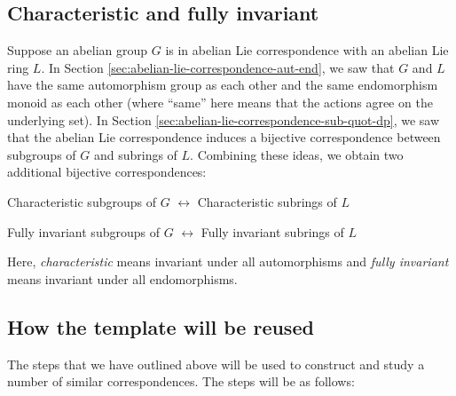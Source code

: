 \documentclass{ucetd}
\begin{document}
\subsection{Characteristic and fully invariant}

Suppose an abelian group $G$ is in abelian Lie correspondence with an
abelian Lie ring $L$. In Section
\ref{sec:abelian-lie-correspondence-aut-end}, we saw that $G$ and $L$
have the same automorphism group as each other and the same
endomorphism monoid as each other (where ``same'' here means that the
actions agree on the underlying set). In Section
\ref{sec:abelian-lie-correspondence-sub-quot-dp}, we saw that the
abelian Lie correspondence induces a bijective correspondence between
subgroups of $G$ and subrings of $L$. Combining these ideas, we obtain
two additional bijective correspondences:

\begin{center}
  Characteristic subgroups of $G$ $\leftrightarrow$ Characteristic
  subrings of $L$
\end{center}

\begin{center}
  Fully invariant subgroups of $G$ $\leftrightarrow$ Fully invariant
  subrings of $L$
\end{center}

Here, {\em characteristic} means invariant under all automorphisms and
{\em fully invariant} means invariant under all endomorphisms.

\subsection{How the template will be reused}\label{sec:isocat-template}

The steps that we have outlined above will be used to construct and
study a number of similar correspondences. The steps will be as
follows:
\end{document}
